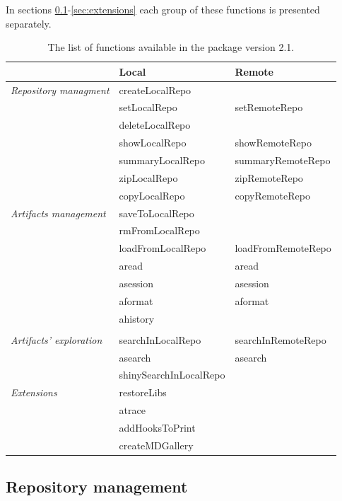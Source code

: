 \documentclass[nojss]{jss}\usepackage[]{graphicx}\usepackage[]{color}
\begin{document}
In sections \ref{sec:repo31}-\ref{sec:extensions} each group of these functions is presented separately.

\begin{table}[t!]
\begin{center}
\begin{tabular}{lll}
\hline
	&	\textbf{Local}	&	\textbf{Remote}	\\ \hline
\textit{Repository managment}	&	createLocalRepo	&		\\
	&	setLocalRepo	&	setRemoteRepo	\\
	&	deleteLocalRepo	&		\\ 
	&	showLocalRepo	&	showRemoteRepo	\\
	&	summaryLocalRepo	&	summaryRemoteRepo	\\  
	&	zipLocalRepo	&	zipRemoteRepo	\\ 
	&	copyLocalRepo	&	copyRemoteRepo	\\ \hline
\textit{Artifacts management} 	&	saveToLocalRepo	&		\\
	&	rmFromLocalRepo 	&		\\  
	&	loadFromLocalRepo	&	loadFromRemoteRepo	\\
	&	aread &	aread	\\
	&	asession &	asession	\\
	&	aformat &	aformat	\\
	&	ahistory	 &		\\ 
	&	\code{\%a\%}	 &		\\  \hline
\textit{Artifacts' exploration}	&	searchInLocalRepo	&	searchInRemoteRepo \\
	&	asearch	&	asearch	\\ 
	&	shinySearchInLocalRepo	&	 	\\ \hline
\textit{Extensions}	&	restoreLibs 	&	 \\
	&	atrace 	&		\\ 
	&	addHooksToPrint	&		\\ 
	&	createMDGallery	&		\\ \hline
\end{tabular}
\caption{\label{tab:functions} The list of functions available in the  package version 2.1. }
\end{center}
\end{table}



\subsection{Repository management}
\label{sec:repo31}
\end{document}

